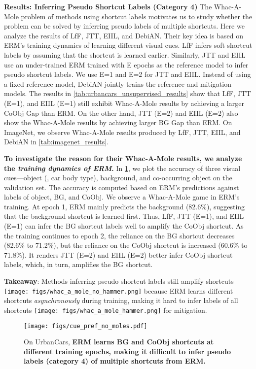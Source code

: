 \documentclass[10pt,twocolumn,letterpaper]{article}
\DeclareRobustCommand{\molehammer}{\begingroup\normalfont
  \texttt{[image: figs/whac\_a\_mole\_hammer.png]}\endgroup
}
\DeclareRobustCommand{\molenohammer}{\begingroup\normalfont
  \texttt{[image: figs/whac\_a\_mole\_no\_hammer.png]}\endgroup
}
\begin{document}
\noindent \textbf{Results: Inferring Pseudo Shortcut Labels (Category 4)} \quad The Whac-A-Mole problem of methods using shortcut labels motivates us to study whether the problem can be solved by inferring pseudo labels of multiple shortcuts.
Here we analyze the results of LfF, JTT, EIIL, and DebiAN.
Their key idea is based on ERM's training dynamics of learning different visual cues.
LfF infers soft shortcut labels by assuming that the shortcut is learned earlier.
Similarly, JTT and EIIL use an under-trained ERM trained with E epochs as the reference model to infer pseudo shortcut labels. We use E=1 and E=2 for JTT and EIIL.
Instead of using a fixed reference model, DebiAN jointly trains the reference and mitigation models.
The results in \cref{tab:urbancars_unsupervised_results} show that LfF, JTT (E=1), and EIIL (E=1) still exhibit Whac-A-Mole results by achieving a larger CoObj Gap than ERM. On the other hand, JTT (E=2) and EIIL (E=2) also show the Whac-A-Mole results by achieving larger BG Gap than ERM.
On ImageNet, we observe Whac-A-Mole results produced by LfF, JTT, EIIL, and DebiAN in \cref{tab:imagenet_results}.

\textbf{To investigate the reason for their Whac-A-Mole results, we analyze the \textit{training dynamics of ERM}.} In \cref{fig:cues_acc_along_epochs}, we plot the accuracy of three visual cues---object (\ie, car body type), background, and co-occurring object on the validation set. The accuracy is computed based on ERM's  predictions against labels of object, BG, and CoObj. We observe a Whac-A-Mole game in ERM's training. At epoch 1, ERM mainly predicts the background (82.6\%), suggesting that the background shortcut is learned first. Thus, LfF, JTT (E=1), and EIIL (E=1) can infer the BG shortcut labels well to amplify the CoObj shortcut.
As the training continues to epoch 2, the reliance on the BG shortcut decreases (82.6\% to 71.2\%), but the reliance on the CoObj shortcut is increased (60.6\% to 71.8\%). It renders JTT (E=2) and EIIL (E=2) better infer CoObj shortcut labels, which, in turn, amplifies the BG shortcut.
\begin{mybox}
    \textbf{Takeaway}: Methods inferring pseudo shortcut labels still amplify shortcuts \molenohammer{} because ERM learns different shortcuts \textit{asynchronously} during training, making it hard to infer labels of all shortcuts \molehammer{} for mitigation.
\end{mybox}



\begin{figure}[t]
  \centering
   \texttt{[image: figs/cue\_pref\_no\_moles.pdf]}
   \caption{On UrbanCars, \textbf{ERM learns BG and CoObj shortcuts at different training epochs, making it difficult to infer pseudo labels (category 4) of multiple shortcuts from ERM.}
   }
   \label{fig:cues_acc_along_epochs}
  \vspace{-4mm}
\end{figure}
\end{document}
